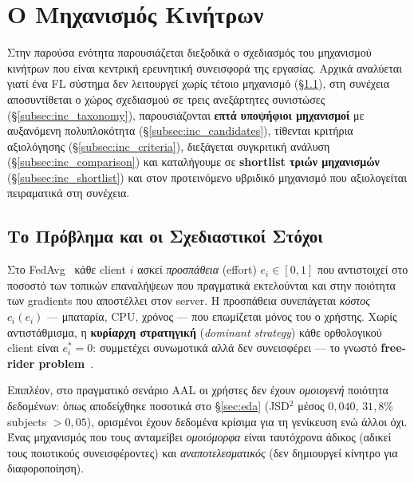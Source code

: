 
\section{Ο Μηχανισμός Κινήτρων}
\label{sec:incentive_mechanism}

Στην παρούσα ενότητα παρουσιάζεται διεξοδικά ο σχεδιασμός του μηχανισμού κινήτρων που είναι κεντρική
ερευνητική συνεισφορά της εργασίας. Αρχικά αναλύεται γιατί ένα FL σύστημα δεν λειτουργεί χωρίς τέτοιο
μηχανισμό (§\ref{subsec:inc_problem}), στη συνέχεια αποσυντίθεται ο χώρος σχεδιασμού σε τρεις ανεξάρτητες
συνιστώσες (§\ref{subsec:inc_taxonomy}), παρουσιάζονται \textbf{επτά υποψήφιοι μηχανισμοί} με
αυξανόμενη πολυπλοκότητα (§\ref{subsec:inc_candidates}), τίθενται κριτήρια αξιολόγησης
(§\ref{subsec:inc_criteria}), διεξάγεται συγκριτική ανάλυση (§\ref{subsec:inc_comparison}) και
καταλήγουμε σε \textbf{shortlist τριών μηχανισμών} (§\ref{subsec:inc_shortlist}) και στον
προτεινόμενο υβριδικό μηχανισμό που αξιολογείται πειραματικά στη συνέχεια.

\subsection{Το Πρόβλημα και οι Σχεδιαστικοί Στόχοι}
\label{subsec:inc_problem}

Στο FedAvg~\cite{McMahan2017} κάθε client $i$ ασκεί \emph{προσπάθεια} (effort) $e_i \in [0,1]$ που
αντιστοιχεί στο ποσοστό των τοπικών επαναλήψεων που πραγματικά εκτελούνται και στην ποιότητα των
gradients που αποστέλλει στον server. Η προσπάθεια συνεπάγεται \emph{κόστος} $c_i(e_i)$ — μπαταρία,
CPU, χρόνος — που επωμίζεται μόνος του ο χρήστης. Χωρίς αντιστάθμισμα, η \textbf{κυρίαρχη στρατηγική}
(\emph{dominant strategy}) κάθε ορθολογικού client είναι $e_i^* = 0$: συμμετέχει συνωμοτικά αλλά δεν
συνεισφέρει — το γνωστό \textbf{free-rider problem}~\cite{Kang2019, Yu2020}.

Επιπλέον, στο πραγματικό σενάριο AAL οι χρήστες δεν έχουν \emph{ομοιογενή} ποιότητα δεδομένων: όπως
αποδείχθηκε ποσοτικά στο §\ref{sec:eda} (JSD$^2$ μέσος $0{,}040$, $31{,}8\%$ subjects $> 0{,}05$),
ορισμένοι έχουν δεδομένα κρίσιμα για τη γενίκευση ενώ άλλοι όχι. Ένας μηχανισμός που τους ανταμείβει
\emph{ομοιόμορφα} είναι ταυτόχρονα άδικος (αδικεί τους ποιοτικούς συνεισφέροντες) και
\emph{αναποτελεσματικός} (δεν δημιουργεί κίνητρο για διαφοροποίηση).


